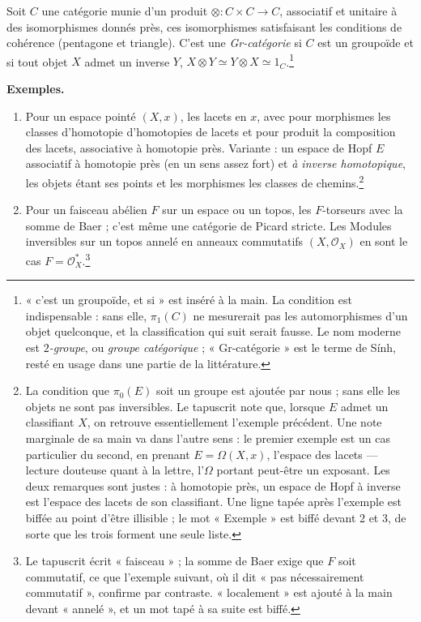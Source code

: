 \documentclass[11pt,a4paper]{article}
\begin{document}
Soit $C$ une catégorie munie d'un produit $\otimes : C \times C \to C$,
associatif et unitaire à des isomorphismes donnés près, ces isomorphismes
satisfaisant les conditions de cohérence (pentagone et triangle). C'est une
\emph{Gr-catégorie} si $C$ est un groupoïde et si tout objet $X$ admet un
inverse $Y$, $X \otimes Y \simeq Y \otimes X \simeq 1_C$.\footnote{« c'est un
groupoïde, et si » est inséré à la main. La condition est indispensable :
sans elle, $\pi_1(C)$ ne mesurerait pas les automorphismes d'un objet
quelconque, et la classification qui suit serait fausse. Le nom moderne est
\emph{$2$-groupe}, ou \emph{groupe catégorique} ; « Gr-catégorie » est le
terme de Sính, resté en usage dans une partie de la littérature.}

\textbf{Exemples.}
\begin{enumerate}
\item[1.] Pour un espace pointé $(X, x)$, les lacets en $x$, avec pour
morphismes les classes d'homotopie d'homotopies de lacets et pour produit la
composition des lacets, associative à homotopie près. Variante : un espace de
Hopf $E$ associatif à homotopie près (en un sens assez fort) et
\emph{à inverse homotopique}, les objets étant ses points et les morphismes
les classes de chemins.\footnote{La condition que $\pi_0(E)$ soit un groupe
est ajoutée par nous ; sans elle les objets ne sont pas inversibles. Le
tapuscrit note que, lorsque $E$ admet un classifiant $X$, on retrouve
essentiellement l'exemple précédent. Une note marginale de sa main va dans
l'autre sens : le premier exemple est un cas particulier du second, en
prenant $E = \Omega(X, x)$, l'espace des lacets --- lecture douteuse quant à
la lettre, l'$\Omega$ portant peut-être un exposant. Les deux remarques sont
justes : à homotopie près, un espace de Hopf à inverse est l'espace des
lacets de son classifiant. Une ligne tapée après l'exemple est biffée au point
d'être illisible ; le mot « Exemple » est biffé devant 2 et 3, de sorte que
les trois forment une seule liste.}
\item[2.] Pour un faisceau abélien $F$ sur un espace ou un topos, les
$F$-torseurs avec la somme de Baer ; c'est même une catégorie de Picard
stricte. Les Modules inversibles sur un topos annelé en anneaux commutatifs
$(X, \mathcal{O}_X)$ en sont le cas $F = \mathcal{O}_X^{*}$.\footnote{Le
tapuscrit écrit « faisceau » ; la somme de Baer exige que $F$ soit
commutatif, ce que l'exemple suivant, où il dit « pas nécessairement
commutatif », confirme par contraste. « localement » est ajouté à la main
devant « annelé », et un mot tapé à sa suite est biffé.}

\end{enumerate}
\end{document}
